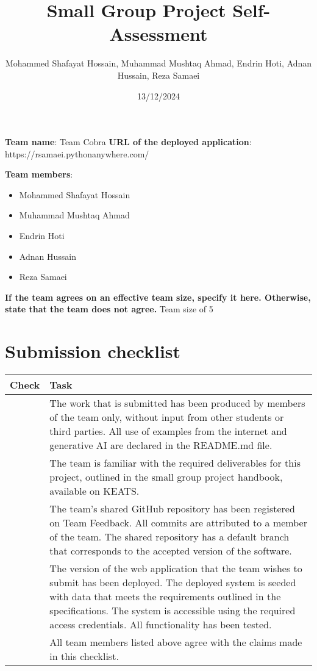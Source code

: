 \documentclass[11pt,a4paper]{article}
\begin{document}
\title{Small Group Project Self-Assessment}
\author{Mohammed Shafayat Hossain, Muhammad Mushtaq Ahmad, Endrin Hoti, Adnan Hussain, Reza Samaei}
\date{13/12/2024}
\maketitle


\noindent\textbf{Team name}: Team Cobra
\noindent\textbf{URL of the deployed application}: https://rsamaei.pythonanywhere.com/

\noindent\textbf{Team members}:
\begin{itemize}
\setlength\itemsep{0em}
\item Mohammed Shafayat Hossain
\item Muhammad Mushtaq Ahmad
\item Endrin Hoti
\item Adnan Hussain
\item Reza Samaei
\end{itemize}

\noindent\textbf{If the team agrees on an effective team size, specify it here.  Otherwise, state that the team does not agree.} 
Team size of 5

\section*{Submission checklist}
\begin{tabular}{|p{15mm}|p{13cm}|}
\hline
Check & Task \\
\hline
& The work that is submitted has been produced by members of the team only, without input from other students or third parties.  All use of examples from the internet and generative AI are declared in the README.md file.\\
\hline
& The team is familiar with the required deliverables for this project, outlined in the small group project handbook, available on KEATS.\\
\hline
& The team's shared GitHub repository has been registered on Team Feedback.  All commits are attributed to a member of the team.  The shared repository has a default branch that corresponds to the accepted version of the software.\\
\hline
& The version of the web application that the team wishes to submit has been deployed.  The deployed system is seeded with data that meets the requirements outlined in the specifications.  The system is accessible using the required access credentials.  All functionality has been tested.\\
\hline
& All team members listed above agree with the claims made in this checklist.\\
\hline
\end{tabular}
\end{document}
